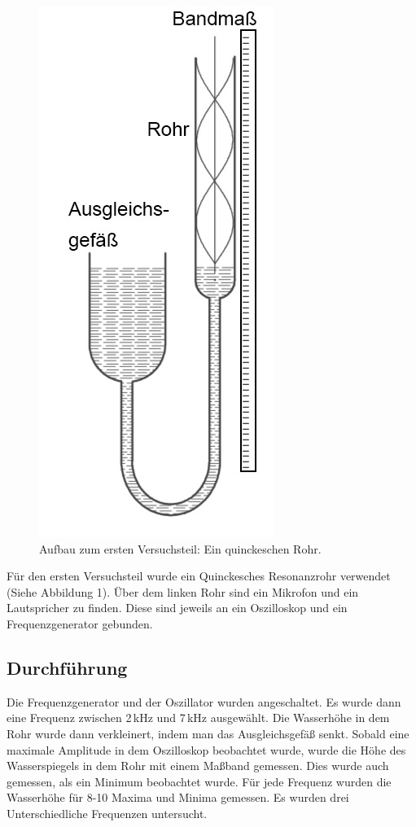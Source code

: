 \documentclass[11pt,a4paper]{article}
\newcommand{\halftime}[4]{\begin{figure}[h]
\begin{minipage}{.#1\textwidth}#3\end{minipage}\begin{minipage}{.#2\textwidth}
\centering
#4\end{minipage}
\end{figure}}
\begin{document}
\begin{figure}
	\centering
	\includegraphics[scale=0.5]{Abb1}
	\caption{Aufbau zum ersten Versuchsteil: Ein quinckeschen Rohr. \cite{Anleitung}}
\end{figure}
Für den ersten Versuchsteil wurde ein Quinckesches Resonanzrohr verwendet (Siehe Abbildung 1). \"Uber dem linken Rohr sind ein Mikrofon und ein Lautspricher zu finden. Diese sind jeweils an ein Oszilloskop und ein Frequenzgenerator gebunden.


\subsection{Durchführung}
Die Frequenzgenerator und der Oszillator wurden angeschaltet. Es wurde dann eine Frequenz zwischen 2\,kHz und 7\,kHz ausgewählt. Die Wasserhöhe in dem Rohr wurde dann verkleinert, indem man das Ausgleichsgefäß senkt. Sobald eine maximale Amplitude in dem Oszilloskop beobachtet wurde, wurde die Höhe des Wasserspiegels in dem Rohr mit einem Maßband gemessen. Dies wurde auch gemessen, als ein Minimum beobachtet wurde. Für jede Frequenz wurden die Wasserhöhe für 8-10 Maxima und Minima gemessen. Es wurden drei Unterschiedliche Frequenzen untersucht. 
\end{document}
